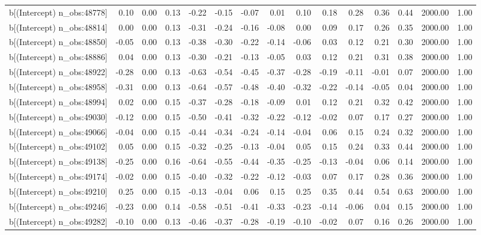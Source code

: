 \begin{table}[ht]
\begin{tabular}{rrrrrrrrrrrrrrr}
  b[(Intercept) n\_obs:48778] & 0.10 & 0.00 & 0.13 & -0.22 & -0.15 & -0.07 & 0.01 & 0.10 & 0.18 & 0.28 & 0.36 & 0.44 & 2000.00 & 1.00 \\ 
  b[(Intercept) n\_obs:48814] & 0.00 & 0.00 & 0.13 & -0.31 & -0.24 & -0.16 & -0.08 & 0.00 & 0.09 & 0.17 & 0.26 & 0.35 & 2000.00 & 1.00 \\ 
  b[(Intercept) n\_obs:48850] & -0.05 & 0.00 & 0.13 & -0.38 & -0.30 & -0.22 & -0.14 & -0.06 & 0.03 & 0.12 & 0.21 & 0.30 & 2000.00 & 1.00 \\ 
  b[(Intercept) n\_obs:48886] & 0.04 & 0.00 & 0.13 & -0.30 & -0.21 & -0.13 & -0.05 & 0.03 & 0.12 & 0.21 & 0.31 & 0.38 & 2000.00 & 1.00 \\ 
  b[(Intercept) n\_obs:48922] & -0.28 & 0.00 & 0.13 & -0.63 & -0.54 & -0.45 & -0.37 & -0.28 & -0.19 & -0.11 & -0.01 & 0.07 & 2000.00 & 1.00 \\ 
  b[(Intercept) n\_obs:48958] & -0.31 & 0.00 & 0.13 & -0.64 & -0.57 & -0.48 & -0.40 & -0.32 & -0.22 & -0.14 & -0.05 & 0.04 & 2000.00 & 1.00 \\ 
  b[(Intercept) n\_obs:48994] & 0.02 & 0.00 & 0.15 & -0.37 & -0.28 & -0.18 & -0.09 & 0.01 & 0.12 & 0.21 & 0.32 & 0.42 & 2000.00 & 1.00 \\ 
  b[(Intercept) n\_obs:49030] & -0.12 & 0.00 & 0.15 & -0.50 & -0.41 & -0.32 & -0.22 & -0.12 & -0.02 & 0.07 & 0.17 & 0.27 & 2000.00 & 1.00 \\ 
  b[(Intercept) n\_obs:49066] & -0.04 & 0.00 & 0.15 & -0.44 & -0.34 & -0.24 & -0.14 & -0.04 & 0.06 & 0.15 & 0.24 & 0.32 & 2000.00 & 1.00 \\ 
  b[(Intercept) n\_obs:49102] & 0.05 & 0.00 & 0.15 & -0.32 & -0.25 & -0.13 & -0.04 & 0.05 & 0.15 & 0.24 & 0.33 & 0.44 & 2000.00 & 1.00 \\ 
  b[(Intercept) n\_obs:49138] & -0.25 & 0.00 & 0.16 & -0.64 & -0.55 & -0.44 & -0.35 & -0.25 & -0.13 & -0.04 & 0.06 & 0.14 & 2000.00 & 1.00 \\ 
  b[(Intercept) n\_obs:49174] & -0.02 & 0.00 & 0.15 & -0.40 & -0.32 & -0.22 & -0.12 & -0.03 & 0.07 & 0.17 & 0.28 & 0.36 & 2000.00 & 1.00 \\ 
  b[(Intercept) n\_obs:49210] & 0.25 & 0.00 & 0.15 & -0.13 & -0.04 & 0.06 & 0.15 & 0.25 & 0.35 & 0.44 & 0.54 & 0.63 & 2000.00 & 1.00 \\ 
  b[(Intercept) n\_obs:49246] & -0.23 & 0.00 & 0.14 & -0.58 & -0.51 & -0.41 & -0.33 & -0.23 & -0.14 & -0.06 & 0.04 & 0.15 & 2000.00 & 1.00 \\ 
  b[(Intercept) n\_obs:49282] & -0.10 & 0.00 & 0.13 & -0.46 & -0.37 & -0.28 & -0.19 & -0.10 & -0.02 & 0.07 & 0.16 & 0.26 & 2000.00 & 1.00 \\ 

\end{tabular}
\end{table}
